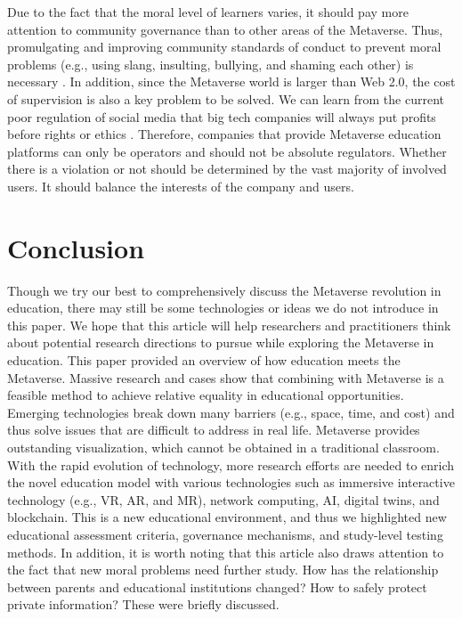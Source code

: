 \documentclass[conference]{IEEEtran}
\begin{document}
Due to the fact that the moral level of learners varies, it should pay more attention to community governance than to other areas of the Metaverse. Thus, promulgating and improving community standards of conduct to prevent moral problems (e.g., using slang, insulting, bullying, and shaming each other) is necessary \cite{inceoglu2022use}. In addition, since the Metaverse world is larger than Web 2.0, the cost of supervision is also a key problem to be solved. We can learn from the current poor regulation of social media that big tech companies will always put profits before rights or ethics \cite{satvik2022laws}. Therefore, companies that provide Metaverse education platforms can only be operators and should not be absolute regulators. Whether there is a violation or not should be determined by the vast majority of involved users. It should balance the interests of the company and users.
 


\section{Conclusion} \label{sec:conclusion}

Though we try our best to comprehensively discuss the Metaverse revolution in education, there may still be some technologies or ideas we do not introduce in this paper. We hope that this article will help researchers and practitioners think about potential research directions to pursue while exploring the Metaverse in education. This paper provided an overview of how education meets the Metaverse. Massive research and cases show that combining with Metaverse is a feasible method to achieve relative equality in educational opportunities. Emerging technologies break down many barriers (e.g., space, time, and cost) and thus solve issues that are difficult to address in real life. Metaverse provides outstanding visualization, which cannot be obtained in a traditional classroom. With the rapid evolution of technology, more research efforts are needed to enrich the novel education model with various technologies such as immersive interactive technology (e.g., VR, AR, and MR), network computing, AI, digital twins, and blockchain. This is a new educational environment, and thus we highlighted new educational assessment criteria, governance mechanisms, and study-level testing methods. In addition, it is worth noting that this article also draws attention to the fact that new moral problems need further study. How has the relationship between parents and educational institutions changed? How to safely protect private information? These were briefly discussed.
\end{document}
